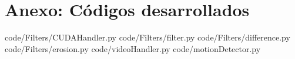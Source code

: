 \documentclass[twoside]{article}
\begin{document}




\section{Anexo: Códigos desarrollados}

%
   {code/Filters/CUDAHandler.py}
%
   {code/Filters/filter.py}
%
   {code/Filters/difference.py}
%
   {code/Filters/erosion.py}
%
   {code/videoHandler.py}
%
   {code/motionDetector.py}
\end{document}
